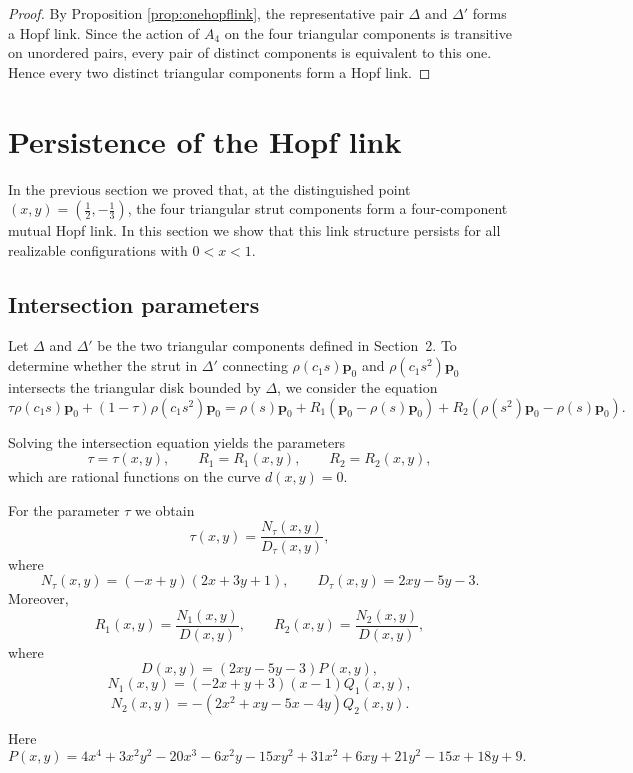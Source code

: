 \documentclass[12pt]{article}
\begin{document}
\begin{proof}
By Proposition \ref{prop:onehopflink},
the representative pair \(\Delta\) and \(\Delta'\) forms a Hopf link.
Since the action of \(A_4\) on the four triangular components is transitive on unordered pairs, every pair of distinct components is equivalent to this one. Hence every two distinct triangular components form a Hopf link.
\end{proof}



\section{Persistence of the Hopf link}

In the previous section we proved that,
at the distinguished point
$(x,y)=\left(\frac12,-\frac13\right)$,
the four triangular strut components form a four-component mutual Hopf link.
In this section we show that this link structure persists
for all realizable configurations with $0<x<1$.

\subsection{Intersection parameters}

Let $\Delta$ and $\Delta'$ be the two triangular components
defined in Section~2.
To determine whether the strut in $\Delta'$ connecting
$\rho(c_1s){\mathbf p}_0$ and $\rho(c_1s^2){\mathbf p}_0$
intersects the triangular disk bounded by $\Delta$,
we consider the equation
\[
 \tau\rho(c_1s){\mathbf p}_0
 +
 (1-\tau)\rho(c_1s^2){\mathbf p}_0
 =
 \rho(s){\mathbf p}_0
 +
 R_1({\mathbf p}_0 - \rho(s){\mathbf p}_0 )
 +
 R_2(\rho(s^2){\mathbf p}_0  - \rho(s){\mathbf p}_0).
\]

Solving the intersection equation yields the parameters
\[
\tau=\tau(x,y), \qquad
R_1=R_1(x,y), \qquad
R_2=R_2(x,y),
\]
which are rational functions on the curve \(d(x,y)=0\).

For the parameter \(\tau\) we obtain
\[
\tau(x,y)=\frac{N_\tau(x,y)}{D_\tau(x,y)},
\]
where
\[
N_\tau(x,y)=(-x+y)(2x+3y+1),
\qquad
D_\tau(x,y)=2xy-5y-3 .
\]
Moreover,
\[
R_1(x,y)=\frac{N_1(x,y)}{D(x,y)},\qquad
R_2(x,y)=\frac{N_2(x,y)}{D(x,y)},
\]
where
\[
D(x,y)=(2xy-5y-3)P(x,y),
\]
\[
N_1(x,y)=(-2x+y+3)(x-1)Q_1(x,y),
\]
\[
N_2(x,y)=-(2x^2+xy-5x-4y)Q_2(x,y).
\]

Here
\[
P(x,y)=
4 x^{4} + 3 x^{2} y^{2} - 20 x^{3} - 6 x^{2} y - 15 x y^{2}
 + 31 x^{2} + 6 x y + 21 y^{2} - 15 x + 18 y + 9 .
\]
\end{document}
